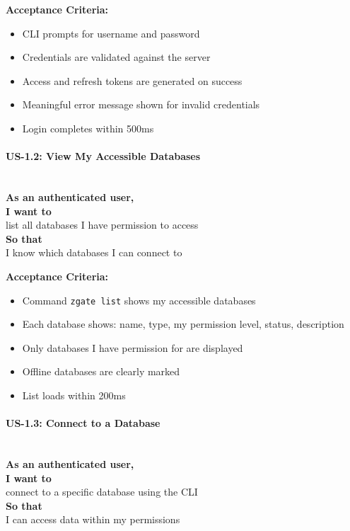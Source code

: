 \noindent\textbf{Acceptance Criteria:}
\begin{itemize}
    \item CLI prompts for username and password
    \item Credentials are validated against the server
    \item Access and refresh tokens are generated on success
    \item Meaningful error message shown for invalid credentials
    \item Login completes within 500ms
\end{itemize}

\paragraph{US-1.2: View My Accessible Databases}
\mbox{}\\[0.5em]

\noindent\textbf{As an authenticated user,} \\
\textbf{I want to} \\
list all databases I have permission to access \\
\textbf{So that} \\
I know which databases I can connect to

\noindent\textbf{Acceptance Criteria:}
\begin{itemize}
    \item Command \texttt{zgate list} shows my accessible databases
    \item Each database shows: name, type, my permission level, status, description
    \item Only databases I have permission for are displayed
    \item Offline databases are clearly marked
    \item List loads within 200ms
\end{itemize}

\paragraph{US-1.3: Connect to a Database}
\mbox{}\\[0.5em]

\noindent\textbf{As an authenticated user,} \\
\textbf{I want to} \\
connect to a specific database using the CLI \\
\textbf{So that} \\
I can access data within my permissions

